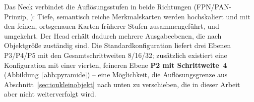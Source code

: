  Das Neck verbindet die Auflösungsstufen in beide Richtungen
(FPN/PAN-Prinzip, \cite{lin2017fpn}): Tiefe, semantisch reiche Merkmalskarten
werden hochskaliert und mit den feinen, ortsgenauen Karten früherer Stufen
zusammengeführt, und umgekehrt. Der Head erhält dadurch mehrere Ausgabeebenen,
die nach Objektgröße zuständig sind. Die Standardkonfiguration liefert drei
Ebenen P3/P4/P5 mit den Gesamtschrittweiten 8/16/32; zusätzlich existiert eine
Konfiguration mit einer vierten, feineren Ebene \textbf{P2 mit Schrittweite~4}
(Abbildung~\ref{abb:pyramide}) -- eine Möglichkeit, die Auflösungsgrenze aus
Abschnitt~\ref{sec:ioukleinobjekt} nach unten zu verschieben, die in dieser
Arbeit aber nicht weiterverfolgt wird.

\begin{figure}[htbp]
\centering
{}
\end{figure}
